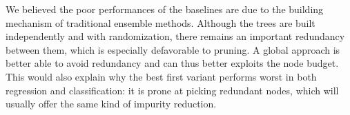 \documentclass{article}
\begin{document}
We believed the poor performances of the baselines are due to the building 
mechanism of traditional ensemble methods. Although the trees are built 
independently and with randomization, there remains an important redundancy 
between them, which is especially defavorable to pruning. A global approach is 
better able to avoid redundancy and can thus better exploits the node budget. 
This would also explain why the best first variant performs worst in both 
regression and classification: it is prone at picking redundant nodes, which 
will usually offer the same kind of impurity reduction.







\end{document}
